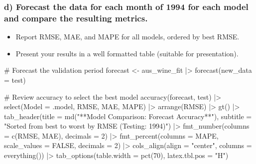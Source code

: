 \documentclass[
  letterpaper,
  DIV=11,
  numbers=noendperiod]{scrartcl}
\newenvironment{Shaded}{\begin{snugshade}}{\end{snugshade}}
\newcommand{\AttributeTok}[1]{\textcolor[rgb]{0.40,0.45,0.13}{#1}}
\newcommand{\CommentTok}[1]{\textcolor[rgb]{0.37,0.37,0.37}{#1}}
\newcommand{\ConstantTok}[1]{\textcolor[rgb]{0.56,0.35,0.01}{#1}}
\newcommand{\DecValTok}[1]{\textcolor[rgb]{0.68,0.00,0.00}{#1}}
\newcommand{\FunctionTok}[1]{\textcolor[rgb]{0.28,0.35,0.67}{#1}}
\newcommand{\NormalTok}[1]{\textcolor[rgb]{0.00,0.23,0.31}{#1}}
\newcommand{\OtherTok}[1]{\textcolor[rgb]{0.00,0.23,0.31}{#1}}
\newcommand{\SpecialCharTok}[1]{\textcolor[rgb]{0.37,0.37,0.37}{#1}}
\newcommand{\StringTok}[1]{\textcolor[rgb]{0.13,0.47,0.30}{#1}}
\providecommand{\tightlist}{%
  \setlength{\itemsep}{0pt}\setlength{\parskip}{0pt}}
\begin{document}
\newpage

\subsubsection{d) Forecast the data for each month of 1994 for each
model and compare the resulting
metrics.}\label{d-forecast-the-data-for-each-month-of-1994-for-each-model-and-compare-the-resulting-metrics.}

\begin{itemize}
\tightlist
\item
  Report RMSE, MAE, and MAPE for all models, ordered by best RMSE.
\item
  Present your results in a well formatted table (suitable for
  presentation).
\end{itemize}

\begin{Shaded}
\begin{Highlighting}[]
\CommentTok{\# Forecast the validation period }
\NormalTok{forecast }\OtherTok{\textless{}{-}}\NormalTok{ aus\_wine\_fit }\SpecialCharTok{|\textgreater{}} \FunctionTok{forecast}\NormalTok{(}\AttributeTok{new\_data =}\NormalTok{ test)}

\CommentTok{\# Review accuracy to select the best model}
\FunctionTok{accuracy}\NormalTok{(forecast, test) }\SpecialCharTok{|\textgreater{}}
  \FunctionTok{select}\NormalTok{(}\AttributeTok{Model =}\NormalTok{ .model, RMSE, MAE, MAPE) }\SpecialCharTok{|\textgreater{}}
  \FunctionTok{arrange}\NormalTok{(RMSE) }\SpecialCharTok{|\textgreater{}}
  \FunctionTok{gt}\NormalTok{() }\SpecialCharTok{|\textgreater{}}
  \FunctionTok{tab\_header}\NormalTok{(}\AttributeTok{title =} \FunctionTok{md}\NormalTok{(}\StringTok{"**Model Comparison: Forecast Accuracy**"}\NormalTok{),}
    \AttributeTok{subtitle =} \StringTok{"Sorted from best to worst by RMSE (Testing: 1994)"}\NormalTok{) }\SpecialCharTok{|\textgreater{}}
  \FunctionTok{fmt\_number}\NormalTok{(}\AttributeTok{columns =} \FunctionTok{c}\NormalTok{(RMSE, MAE), }\AttributeTok{decimals =} \DecValTok{2}\NormalTok{) }\SpecialCharTok{|\textgreater{}}
  \FunctionTok{fmt\_percent}\NormalTok{(}\AttributeTok{columns =}\NormalTok{ MAPE, }\AttributeTok{scale\_values =} \ConstantTok{FALSE}\NormalTok{, }\AttributeTok{decimals =} \DecValTok{2}\NormalTok{) }\SpecialCharTok{|\textgreater{}}
  \FunctionTok{cols\_align}\NormalTok{(}\AttributeTok{align =} \StringTok{"center"}\NormalTok{, }\AttributeTok{columns =} \FunctionTok{everything}\NormalTok{()) }\SpecialCharTok{|\textgreater{}}
  \FunctionTok{tab\_options}\NormalTok{(}\AttributeTok{table.width =} \FunctionTok{pct}\NormalTok{(}\DecValTok{70}\NormalTok{), }\AttributeTok{latex.tbl.pos =} \StringTok{"H"}\NormalTok{)}
\end{Highlighting}
\end{Shaded}
\end{document}
